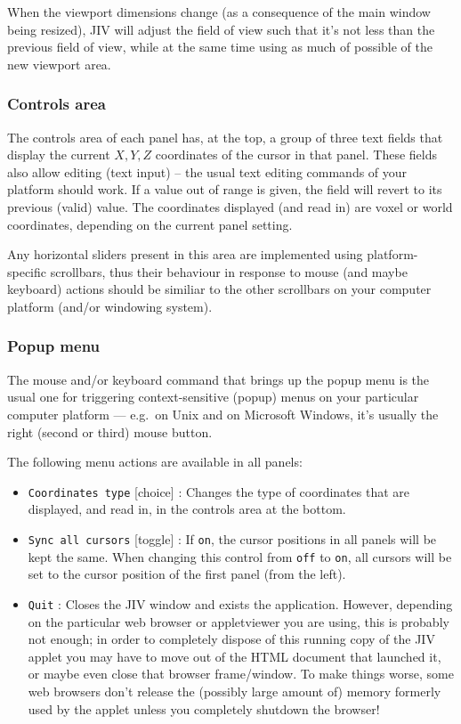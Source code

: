 When the viewport dimensions change (as a consequence of the main
window being resized), JIV will adjust the field of view such that
it's not less than the previous field of view, while at the same time
using as much of possible of the new viewport area.

\subsubsection{Controls area}
The controls area of each panel has, at the top, a group of three text
fields that display the current $X,Y,Z$ coordinates of the cursor in
that panel. These fields also allow editing (text input) -- the usual
text editing commands of your platform should work.  If a value out of
range is given, the field will revert to its previous (valid) value.
The coordinates displayed (and read in) are voxel or world
coordinates, depending on the current panel setting.

Any horizontal sliders present in this area are implemented using
platform-specific scrollbars, thus their behaviour in response to
mouse (and maybe keyboard) actions should be similiar to the other
scrollbars on your computer platform (and/or windowing system).

\subsubsection{Popup menu}
The mouse and/or keyboard command that brings up the popup menu is the
usual one for triggering context-sensitive (popup) menus on your
particular computer platform --- e.g.\ on Unix and on Microsoft
Windows, it's usually the right (second or third) mouse button.

The following menu actions are available in all panels:
\begin{itemize}
\item \verb+Coordinates type+ [choice] : Changes the type of
  coordinates that are displayed, and read in, in the controls area at
  the bottom.
\item \verb+Sync all cursors+ [toggle] : If \verb+on+, the cursor
  positions in all panels will be kept the same. When changing this
  control from \verb+off+ to \verb+on+, all cursors will be set to the
  cursor position of the first panel (from the left).
\item \verb+Quit+ : Closes the JIV window and exists the application.
  However, depending on the particular web browser or appletviewer you
  are using, this is probably not enough; in order to completely
  dispose of this running copy of the JIV applet you may have to move
  out of the HTML document that launched it, or maybe even close that
  browser frame/window. To make things worse, some web browsers don't
  release the (possibly large amount of) memory formerly used by the
  applet unless you completely shutdown the browser!
\end{itemize}

